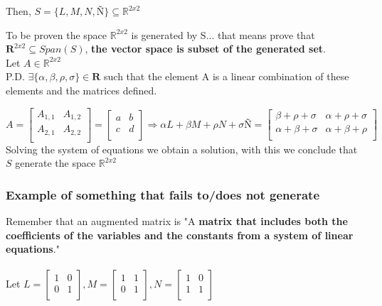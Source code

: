 \documentclass{article}
\begin{document}
Then, \(S = \{L,M,N,Ñ\} \subseteq \mathbb{R}^{2x2}\)

To be proven the space \(\mathbb{R}^{2x2}\) is generated by S... that means prove that \(\mathbf{R}^{2x2} \subseteq Span(S)\), \textbf{the vector space is subset of the generated set}.
\\

Let \(A \in \mathbb{R}^{2x2}\)
\\

P.D. \(\exists \{\alpha, \beta, \rho, \sigma\} \in \mathbf{R}\) such that the element A is a linear combination of these elements and the matrices defined.

\(A = \begin{bmatrix}
    A_{1,1} & A_{1,2} \\
    A_{2,1} & A_{2,2} \\
\end{bmatrix} = \begin{bmatrix}
    a & b \\
    c & d \\
\end{bmatrix} \Rightarrow \alpha L + \beta M + \rho N + \sigma Ñ = \begin{bmatrix}
    \beta + \rho + \sigma & \alpha + \rho + \sigma \\
    \alpha + \beta + \sigma & \alpha + \beta + \rho \\
\end{bmatrix}\)
\\

Solving the system of equations we obtain a solution, with this we conclude that \(S\) generate the space \(\mathbb{R}^{2x2}\)

\subsubsection*{Example of something that fails to/does not generate}
Remember that an augmented matrix is "A \textbf{matrix that includes both the coefficients of the variables and the constants from a system of linear equations}."
\\\\
Let \(L = \begin{bmatrix}
    1 & 0 \\
    0 & 1 \\
\end{bmatrix}, M = \begin{bmatrix}
    1 & 1 \\
    0 & 1 \\
\end{bmatrix}, N = \begin{bmatrix}
    1 & 0 \\
    1 & 1 \\
\end{bmatrix}\)
\\
\end{document}
